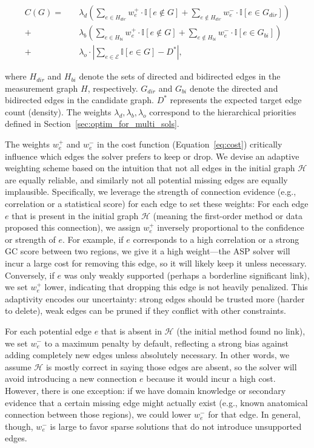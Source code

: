 \begin{equation}
\begin{aligned}
C(G) = \quad & \lambda_d \left( \sum_{e \in H_{dir}} w^+_e \cdot \mathbb{I}[e \notin G] + \sum_{e \notin H_{dir}} w^-_e \cdot \mathbb{I}[e \in G_{dir}] \right) \\
+ \quad & \lambda_b \left( \sum_{e \in H_{bi}} w^+_e \cdot \mathbb{I}[e \notin G] + \sum_{e \notin H_{bi}} w^-_e \cdot \mathbb{I}[e \in G_{bi}] \right) \\
+ \quad & \lambda_o \cdot \left| \sum_{e \in \mathcal{E}} \mathbb{I}[e \in G] - D^* \right|,
\end{aligned}
\label{eq:cost}
\end{equation}

where $H_{dir}$ and $H_{bi}$ denote the sets of directed and bidirected edges in the measurement graph $H$, respectively. $G_{dir}$ and $G_{bi}$ denote the directed and bidirected edges in the candidate graph. $D^*$ represents the expected target edge count (density). The weights $\lambda_d, \lambda_b, \lambda_o$ correspond to the hierarchical priorities defined in Section~\ref{sec:optim_for_multi_sols}.

The weights $w^+_{e}$ and $w^-_{e}$ in the cost function (Equation~\ref{eq:cost}) critically influence which edges the solver prefers to keep or drop. We devise an adaptive weighting scheme based on the intuition that not all edges in the initial graph $\mathcal{H}$ are equally reliable, and similarly not all potential missing edges are equally implausible. Specifically, we leverage the strength of connection evidence (e.g., correlation or a statistical score) for each edge to set these weights:
For each edge $e$ that is present in the initial graph $\mathcal{H}$ (meaning the first-order method or data proposed this connection), we assign $w^+_{e}$ inversely proportional to the confidence or strength of $e$. For example, if $e$ corresponds to a high correlation or a strong GC score between two regions, we give it a high weight---the ASP solver will incur a large cost for removing this edge, so it will likely keep it unless necessary. Conversely, if $e$ was only weakly supported (perhaps a borderline significant link), we set $w^+_{e}$ lower, indicating that dropping this edge is not heavily penalized. This adaptivity encodes our uncertainty: strong edges should be trusted more (harder to delete), weak edges can be pruned if they conflict with other constraints.

For each potential edge $e$ that is absent in $\mathcal{H}$ (the initial method found no link), we set $w^-_{e}$ to a maximum penalty by default, reflecting a strong bias against adding completely new edges unless absolutely necessary. In other words, we assume $\mathcal{H}$ is mostly correct in saying those edges are absent, so the solver will avoid introducing a new connection $e$ because it would incur a high cost. However, there is one exception: if we have domain knowledge or secondary evidence that a certain missing edge might actually exist (e.g., known anatomical connection between those regions), we could lower $w^-_{e}$ for that edge. In general, though, $w^-_{e}$ is large to favor sparse solutions that do not introduce unsupported edges.

